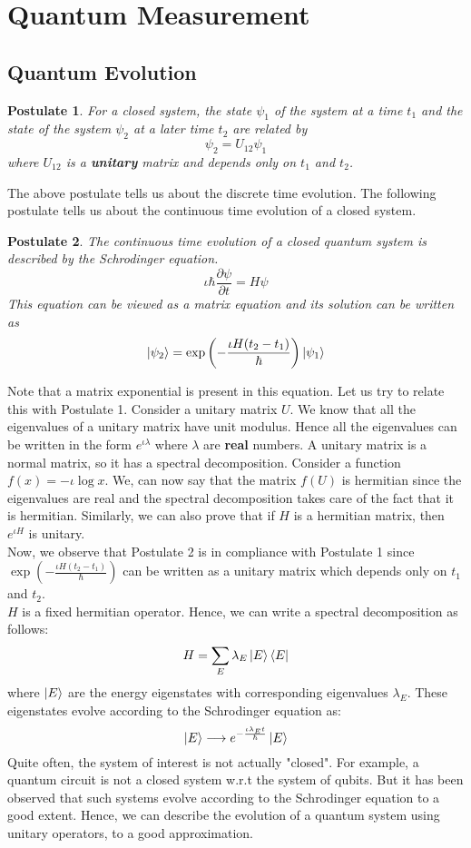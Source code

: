 \documentclass{article}
\begin{document}
\cleardoublepage
\section{Quantum Measurement}
\subsection{Quantum Evolution}
\newtheorem{post}{Postulate}
\begin{post}
For a closed system, the state $\psi_1$ of the system at a time $t_1$ and the state of the system $\psi_2$ at a later time $t_2$ are related by $$\psi_2 = U_{12} \psi_1$$ where $U_{12}$ is a \textbf{unitary} matrix and depends only on $t_1$ and $t_2$.
\end{post}
The above postulate tells us about the discrete time evolution. The following postulate tells us about the continuous time evolution of a closed system.

\begin{post}
The continuous time evolution of a closed quantum system is described by the Schrodinger equation.
$$\iota \hbar \frac{\partial \psi}{\partial t} = H\psi$$
This equation can be viewed as a matrix equation and its solution can be written as $$\ket{\psi_2} = \exp \left( -\frac{\iota H(t_2-t_1)}{\hbar} \right) \ket{\psi_1}$$
\end{post}
Note that a matrix exponential is present in this equation. Let us try to relate this with Postulate 1. Consider a unitary matrix $U$. We know that all the eigenvalues of a unitary matrix have unit modulus. Hence all the eigenvalues can be written in the form $e^{\iota \lambda}$ where $\lambda$ are \textbf{real} numbers. A unitary matrix is a normal matrix, so it has a spectral decomposition. Consider a function $f(x) = -\iota \log x$. We, can now say that the matrix $f(U)$ is hermitian since the eigenvalues are real and the spectral decomposition takes care of the fact that it is hermitian. Similarly, we can also prove that if $H$ is a hermitian matrix, then $e^{\iota H}$ is unitary.\\[4pt]
Now, we observe that Postulate 2 is in compliance with Postulate 1 since $\exp \left( -\frac{\iota H(t_2-t_1)}{\hbar} \right)$ can be written as a unitary matrix which depends only on $t_1$ and $t_2$.\\[3pt]
$H$ is a fixed hermitian operator. Hence, we can write a spectral decomposition as follows:
$$H = \sum_E \lambda_E \ket{E}\bra{E}$$ where $\ket{E}$ are the energy eigenstates with corresponding eigenvalues $\lambda_E$. These eigenstates evolve according to the Schrodinger equation as:
$$\ket{E} \longrightarrow e^{-\frac{\iota \lambda_E t}{\hbar}} \ket{E}$$
Quite often, the system of interest is not actually "closed". For example, a quantum circuit is not a closed system w.r.t the system of qubits. But it has been observed that such systems evolve according to the Schrodinger equation to a good extent. Hence, we can describe the evolution of a quantum system using unitary operators, to a good approximation.
\end{document}
